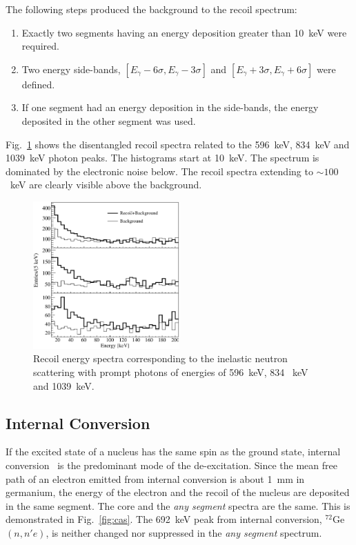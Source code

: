 \documentclass{elsart}
\begin{document}
The following steps produced the background to the recoil spectrum:
\begin{enumerate}
\item Exactly two segments having an energy deposition greater than
  10~keV were required.
\item Two energy side-bands, $[E_\gamma-6\sigma, E_\gamma-3\sigma]$
  and $[E_\gamma+3\sigma, E_\gamma+6\sigma]$ were defined.
\item If one segment had an energy deposition in the side-bands, the
  energy deposited in the other segment was used.
\end{enumerate}

Fig.~\ref{fig:recoil} shows the disentangled recoil spectra related to
the 596~keV, 834~keV and 1039~keV photon peaks. The histograms start
at 10~keV. The spectrum is dominated by the electronic noise
below. The recoil spectra extending to $\sim 100$~keV are clearly
visible above the background.

\begin{figure}[tbhp]
  \centering
  \includegraphics[width=0.5\textwidth]{recoil.eps}
  \caption{Recoil energy spectra corresponding to the inelastic
    neutron scattering with prompt photons of energies of 596~keV, 834
    ~keV and 1039~keV.}
  \label{fig:recoil}
\end{figure}

\subsection{Internal Conversion}
\label{sec:conv}
If the excited state of a nucleus has the same spin as the ground
state, internal conversion~\cite{inco1, inco2} is the predominant mode
of the de-excitation. Since the mean free path of an electron emitted
from internal conversion is about 1~mm in germanium, the energy of the
electron and the recoil of the nucleus are deposited in the same
segment. The core and the \emph{any segment} spectra are the
same. This is demonstrated in Fig.~\ref{fig:cas}. The 692~keV peak
from internal conversion, $^{72}$Ge$(n,n'e)$, is neither changed nor
suppressed in the \emph{any segment} spectrum.
\end{document}

